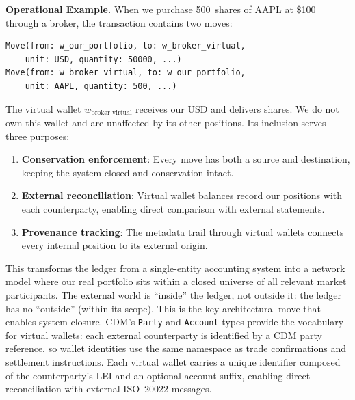 \documentclass[11pt,a4paper]{article}
\begin{document}
\noindent\textbf{Operational Example.} When we purchase 500~shares of AAPL at \$100 through a broker, the transaction contains two moves:

\begin{lstlisting}
Move(from: w_our_portfolio, to: w_broker_virtual,
    unit: USD, quantity: 50000, ...)
Move(from: w_broker_virtual, to: w_our_portfolio,
    unit: AAPL, quantity: 500, ...)
\end{lstlisting}

The virtual wallet $w_{\text{broker\_virtual}}$ receives our USD and delivers shares. We do not own this wallet and are unaffected by its other positions. Its inclusion serves three purposes:

\begin{enumerate}
\item \textbf{Conservation enforcement}: Every move has both a source and destination, keeping the system closed and conservation intact.
\item \textbf{External reconciliation}: Virtual wallet balances record our positions with each counterparty, enabling direct comparison with external statements.
\item \textbf{Provenance tracking}: The metadata trail through virtual wallets connects every internal position to its external origin.
\end{enumerate}

This transforms the ledger from a single-entity accounting system into a network model where our real portfolio sits within a closed universe of all relevant market participants. The external world is ``inside'' the ledger, not outside it: the ledger has no ``outside'' (within its scope). This is the key architectural move that enables system closure. CDM's \texttt{Party} and \texttt{Account} types provide the vocabulary for virtual wallets: each external counterparty is identified by a CDM party reference, so wallet identities use the same namespace as trade confirmations and settlement instructions. Each virtual wallet carries a unique identifier composed of the counterparty's LEI and an optional account suffix, enabling direct reconciliation with external ISO~20022 messages.
\end{document}
